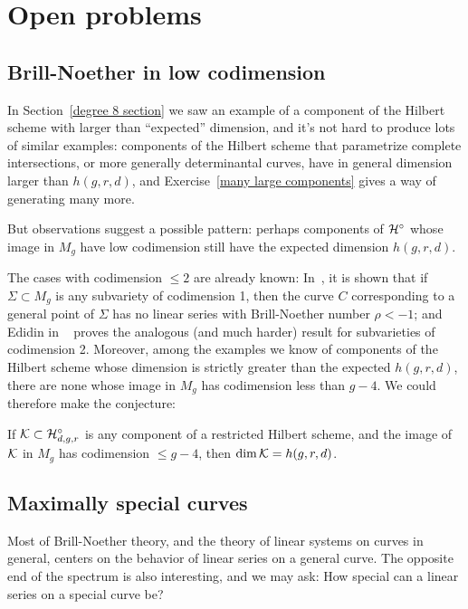 \section{Open problems}\label{open problems}

\subsection{Brill-Noether in low codimension}
 
In Section~\ref{degree 8 section} we saw an example of a component of the Hilbert scheme with larger than ``expected'' dimension, and it's not hard to produce lots of similar examples: components of the Hilbert scheme that parametrize complete intersections, or more generally determinantal curves, have in general dimension larger than $h(g,r,d)$, and Exercise~\ref{many large components} gives a way of generating many more.

 But observations suggest a possible pattern: perhaps components of $\cH^\circ$ whose image in $M_g$ have low codimension still have the expected dimension $h(g,r,d)$. 

The cases with codimension $\leq 2$ are already known: In~\cite{BrillNoether-1}, it is shown that if $\Sigma \subset M_g$ is any subvariety of codimension 1, then the curve $C$ corresponding to a general point of $\Sigma$ has no linear series with Brill-Noether number $\rho < -1$; and Edidin in ~\cite{Edidin} proves the analogous (and much harder) result for subvarieties of codimension 2. Moreover, among the examples we know of components of the Hilbert scheme whose dimension is strictly greater than the expected $h(g,r,d)$, there are none whose image in $M_g$ has codimension less than $g-4$. We could therefore make the conjecture:

\begin{conjecture}
If $\cK \subset \cH^\circ_{d,g,r}$ is any component of a restricted Hilbert scheme, and the image of $\cK$ in $M_g$ has codimension $\leq g-4$, then $\dim \cK = h(g,r,d)$.
\end{conjecture}

\subsection{Maximally special  curves} Most of Brill-Noether theory, and the theory of linear systems on curves in general, centers on the behavior of linear series on a general curve. The opposite end of the spectrum is also interesting, and we may ask: How special can a linear series on a special curve be?

